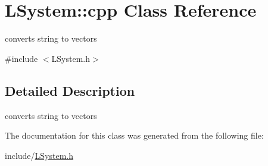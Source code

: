 \hypertarget{classLSystem_1_1cpp}{
\section{LSystem::cpp Class Reference}
\label{classLSystem_1_1cpp}
}


converts string to vectors  


{\ttfamily \#include $<$LSystem.h$>$}

\subsection{Detailed Description}
converts string to vectors 

The documentation for this class was generated from the following file:\begin{DoxyCompactItemize}
\item 
include/\hyperlink{LSystem_8h}{LSystem.h}\end{DoxyCompactItemize}

